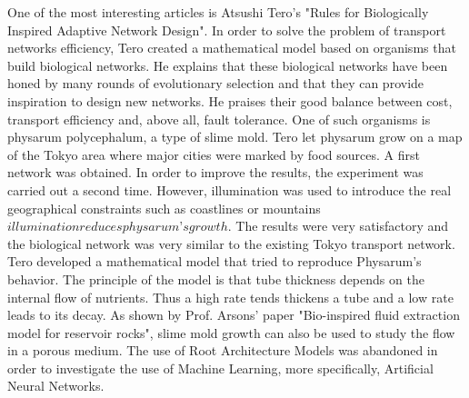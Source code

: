 One of the most interesting articles is Atsushi Tero’s "Rules for Biologically Inspired
Adaptive Network Design". In order to solve the problem of transport networks efficiency,
Tero created a mathematical model based on organisms that build biological networks. He
explains that these biological networks have been honed by many rounds of evolutionary
selection and that they can provide inspiration to design new networks. He praises their
good balance between cost, transport efficiency and, above all, fault tolerance. One of
such organisms is physarum polycephalum, a type of slime mold. Tero let physarum
grow on a map of the Tokyo area where major cities were marked by food sources. A
first network was obtained. In order to improve the results, the experiment was carried
out a second time. However, illumination was used to introduce the real geographical
constraints such as coastlines or mountains \(illumination reduces physarum’s growth\). The
results were very satisfactory and the biological network was very similar to the existing
Tokyo transport network. Tero developed a mathematical model that tried to reproduce
Physarum’s behavior. The principle of the model is that tube thickness depends on the
internal flow of nutrients. Thus a high rate tends thickens a tube and a low rate leads
to its decay. As shown by Prof. Arsons’ paper "Bio-inspired fluid extraction model for
reservoir rocks", slime mold growth can also be used to study the flow in a porous medium.
The use of Root Architecture Models was abandoned in order to investigate the use of Machine Learning, more specifically, Artificial Neural Networks.

